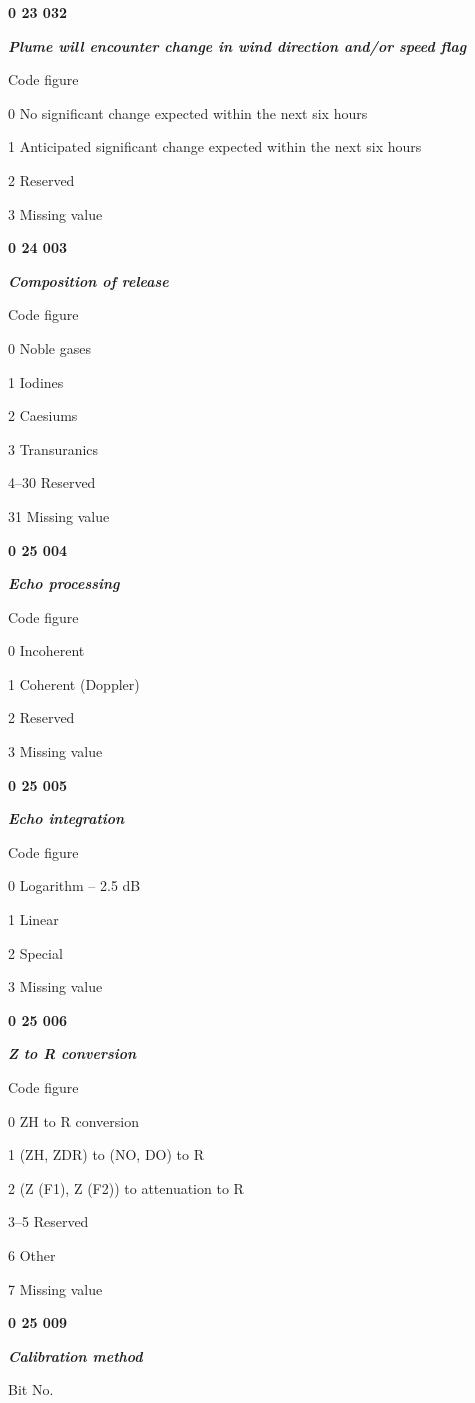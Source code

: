 \textbf{0 23 032}

\emph{\textbf{Plume will encounter change in wind direction and/or speed flag}}

Code figure

0 No significant change expected within the next six hours

1 Anticipated significant change expected within the next six hours

2 Reserved

3 Missing value

\textbf{0 24 003}

\emph{\textbf{Composition of release}}

Code figure

0 Noble gases

1 Iodines

2 Caesiums

3 Transuranics

4--30 Reserved

31 Missing value

\textbf{0 25 004}

\emph{\textbf{Echo processing}}

Code figure

0 Incoherent

1 Coherent (Doppler)

2 Reserved

3 Missing value

\textbf{0 25 005}

\emph{\textbf{Echo integration}}

Code figure

0 Logarithm -- 2.5 dB

1 Linear

2 Special

3 Missing value

\textbf{0 25 006}

\emph{\textbf{Z to R conversion}}

Code figure

0 ZH to R conversion

1 (ZH, ZDR) to (NO, DO) to R

2 (Z (F1), Z (F2)) to attenuation to R

3--5 Reserved

6 Other

7 Missing value

\textbf{0 25 009}

\emph{\textbf{Calibration method}}

Bit No.

